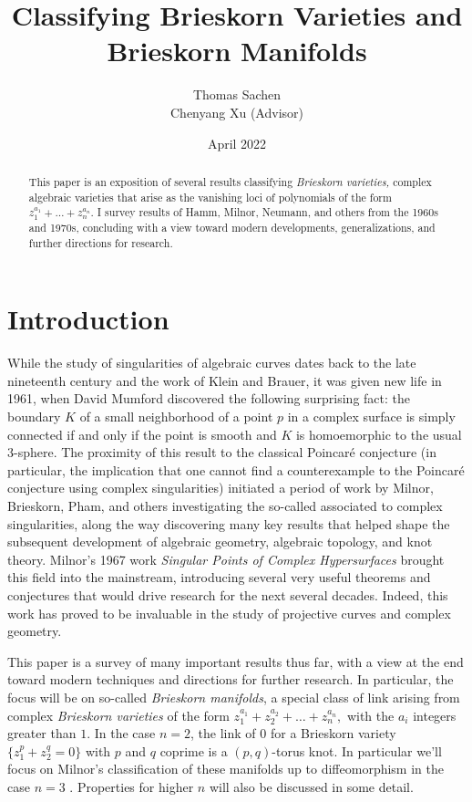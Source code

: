 \documentclass{article}
\title{Classifying Brieskorn Varieties and Brieskorn Manifolds}
\author{Thomas Sachen\\[1ex] 
\small Chenyang Xu (Advisor)}
\date{April 2022}
\begin{document}
\maketitle

\begin{abstract}
    This paper is an exposition of several results classifying \textit{Brieskorn varieties,} complex algebraic varieties that arise as the vanishing loci of polynomials of the form $z_1^{a_1} + \dots + z_n^{a_n}$. I survey results of Hamm, Milnor, Neumann, and others from the 1960s and 1970s, concluding with a view toward modern developments, generalizations, and further directions for research.
\end{abstract}

\section{Introduction}

While the study of singularities of algebraic curves dates back to the late nineteenth century and the work of Klein and Brauer, it was given new life in 1961, when David Mumford discovered the following surprising fact: the boundary $K$ of a small neighborhood of a point $p$ in a complex surface is simply connected if and only if the point is smooth and $K$ is homoemorphic to the usual $3$-sphere. The proximity of this result to the classical Poincar\'{e} conjecture (in particular, the implication that one cannot find a counterexample to the Poincar\'{e} conjecture using complex singularities) initiated a period of work by Milnor, Brieskorn, Pham, and others investigating the so-called  associated to complex singularities, along the way discovering many key results that helped shape the subsequent development of algebraic geometry, algebraic topology, and knot theory.
Milnor's 1967 work \textit{Singular Points of Complex Hypersurfaces} brought this field into the mainstream, introducing several very useful theorems and conjectures that would drive research for the next several decades. Indeed, this work has proved to be invaluable in the study of projective curves and complex geometry.

This paper is a survey of many important results thus far, with a view at the end toward modern techniques and directions for further research. In particular, the focus will be on so-called \textit{Brieskorn manifolds}, a special class of link arising from complex \textit{Brieskorn varieties} of the form $z_1^{a_1} + z_2^{a_2} + \dots + z_n^{a_n},$ with the $a_i$ integers greater than $1$. In the case $n=2$, the link of $0$ for a Brieskorn variety $\{z_1^p + z_2^q = 0\}$ with $p$ and $q$ coprime is a $(p,q)$-torus knot. In particular we'll focus on Milnor's classification of these manifolds up to diffeomorphism in the case $n=3$ \cite{milnor_1975}. Properties for higher $n$ will also be discussed in some detail.
\end{document}
